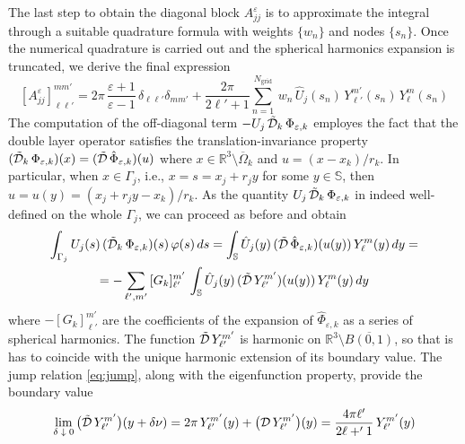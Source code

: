 The last step to obtain the diagonal block $A_{jj}^\varepsilon$ is to approximate the integral through a suitable quadrature formula with weights $\{w_n\}$ and nodes $\{ s_n\}$. Once the numerical quadrature is carried out and the spherical harmonics expansion is truncated, we derive the final expression
\begin{equation}\label{eq:ajj}
[A_{jj}^\varepsilon]_{\ell \ell'}^{mm'} = 2\pi \, \frac{\varepsilon+1}{\varepsilon-1} \,  \delta_{\ell \ell'} \delta_{mm'} + \frac{2\pi}{2\ell'+1} \sum_{n=1}^{N_\text{grid}} \, w_n \, \hat{U}_j(s_n)  \, Y_{\ell'}^{m'}(s_n)\,  Y_\ell^m(s_n)
\end{equation}
The computation of the off-diagonal term $-U_j \, \tilde{\mathcal{D}}_k \, \Phi_{\varepsilon,k}$ employes the fact that the double layer operator satisfies the translation-invariance property $(\tilde{\mathcal{D}}_k \, \Phi_{\varepsilon,k} )(x) = (\tilde{\mathcal{D}} \, \hat{\Phi}_{\varepsilon,k})(u)$ where $x \in \mathbb{R}^3 \setminus \overline{\Omega}_k$ and $u = (x -x_k)/ r_k$. In particular, when $x \in \Gamma_j$, i.e., $x = s = x_j + r_j y$ for some $y \in \mathbb{S}$, then $u = u(y) = (x_j + r_j y -x_k)/r_k$. As the quantity $U_j \, \tilde{\mathcal{D}}_k \, \Phi_{\varepsilon,k}$ in indeed well-defined on the whole $\Gamma_j$, we can proceed as before and obtain
\begin{multline*}
\int_{\Gamma_j}U_j(s) \, (\tilde{\cD}_k \, \Phi_{\varepsilon,k})(s) \, \varphi(s) \, ds =  \int_\mathbb{S} \hat{U}_j(y) \, (\tilde{\cD} \, \hat{\Phi}_{\varepsilon,k})(u(y)) \, Y_{\ell}^{m}(y) \, dy = \\ %
= -\sum_{\ell',m'} \, [G_k]_{\ell'}^{m'} \,  \int_\mathbb{S} \hat{U}_j(y) \, (\tilde{\cD} \, Y_{\ell'}^{m'})(u(y)) \, Y_{\ell}^{m}(y) \, dy 
\end{multline*}
where $-[G_k]_{\ell'}^{m'}$ are the coefficients of the expansion of $ \hat{\Phi}_{\varepsilon,k}$ as a series of spherical harmonics. The function $\tilde{\mathcal{D}} \, Y_{\ell'}^{m'}$ is harmonic on $\mathbb{R}^3 \setminus \overline{B(0,1)}$, so that is has to coincide with the unique harmonic extension of its boundary value. The jump relation \eqref{eq:jump}, along with the eigenfunction property, provide the boundary value
\[
\lim_{\delta \; \downarrow \;  0} \big(\tilde{\mathcal{D}} \, Y_{\ell'}^{m'}\big)(y + \delta \nu) =  2\pi \,Y_{\ell'}^{m'}(y)+ \big( \mathcal{D} \, Y_{\ell'}^{m'} \big)(y) = \frac{4 \pi \ell'}{2 \ell +' 1} \, Y_{\ell'}^{m'}(y)
\]
